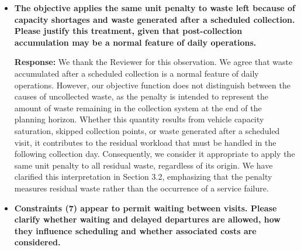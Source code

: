 \documentclass[11pt]{article}
\begin{document}
\begin{enumerate}
\begin{itemize}
\noindent\textbf{Response:} We thank the Reviewer for this observation. We agree that the operational setting underlying the restricted recourse mechanism should be more clearly motivated. We have expanded Section 3.2 to clarify that our formulation addresses a collection system in which routes are determined before the operating day and each vehicle performs at most one collection trip. When vehicle capacity is exhausted, the remaining planned visits are postponed rather than reassigned to other vehicles. This setting is relevant when unloading and resuming collection would require additional travel and handling time that may not be compatible with the available working shift, or when operational procedures do not support real-time route modifications. We have also explicitly acknowledged that the proposed recourse mechanism does not cover more flexible operations involving multiple trips, intermediate unloading facilities, or dynamic reassignment of collection points. These extensions would require a different recourse structure and are outside the scope of the present study.


\item \textbf{The objective applies the same unit penalty to waste left because of capacity shortages
and waste generated after a scheduled collection. Please justify this treatment, given that
post-collection accumulation may be a normal feature of daily operations.}


\noindent\textbf{Response:} We thank the Reviewer for this observation. We agree that waste accumulated after a scheduled collection is a normal feature of daily operations. However, our objective function does not distinguish between the causes of uncollected waste, as the penalty is intended to represent the amount of waste remaining in the collection system at the end of the planning horizon. Whether this quantity results from vehicle capacity saturation, skipped collection points, or waste generated after a scheduled visit, it contributes to the residual workload that must be handled in the following collection day. Consequently, we consider it appropriate to apply the same unit penalty to all residual waste, regardless of its origin. We have clarified this interpretation in Section 3.2, emphasizing that the penalty measures residual waste rather than the occurrence of a service failure.



\item \textbf{Constraints (7) appear to permit waiting between visits. Please clarify whether waiting
and delayed departures are allowed, how they influence scheduling and whether associated costs are considered.}



\end{itemize}
\end{enumerate}
\end{document}
